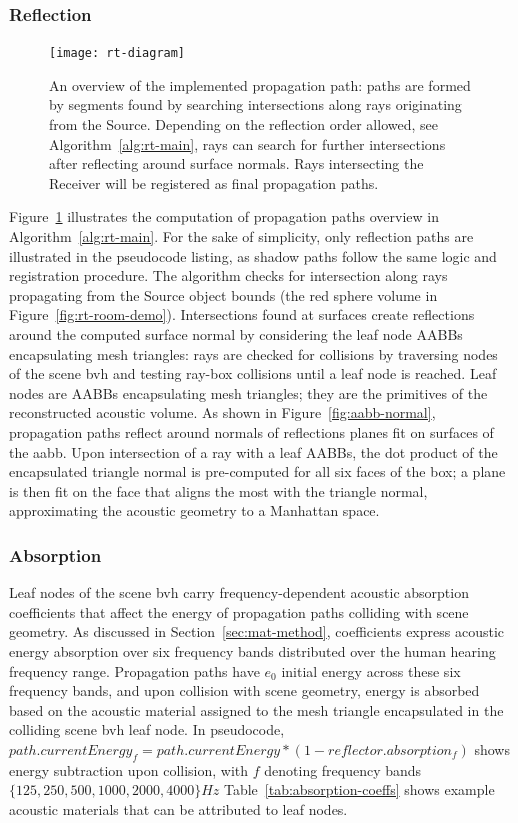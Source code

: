 \subsubsection{Reflection}
\begin{figure}[h]
    \centering
    \texttt{[image: rt-diagram]}
    \caption[Ray Tracing --- propagation diagram]{An overview of the implemented propagation path: paths are formed by segments found by searching intersections along rays originating from the Source. Depending on the reflection order allowed, see Algorithm~\ref{alg:rt-main}, rays can search for further intersections after reflecting around surface normals. Rays intersecting the Receiver will be registered as final propagation paths.}
\label{fig:rt-reflection-diagram}
\end{figure}
Figure~\ref{fig:rt-reflection-diagram} illustrates the computation of propagation paths overview in Algorithm~\ref{alg:rt-main}. For the sake of simplicity, only reflection paths are illustrated in the pseudocode listing, as shadow paths follow the same logic and registration procedure. The algorithm checks for intersection along rays propagating from the Source object bounds (the red sphere volume in Figure~\ref{fig:rt-room-demo}). Intersections found at surfaces create reflections around the computed surface normal by considering the leaf node AABBs encapsulating mesh triangles: rays are checked for collisions by traversing nodes of the scene \acrshort{bvh} and testing ray-box collisions until a leaf node is reached. Leaf nodes are AABBs encapsulating mesh triangles; they are the primitives of the reconstructed acoustic volume. As shown in Figure~\ref{fig:aabb-normal}, propagation paths reflect around normals of reflections planes fit on surfaces of the \acrshort{aabb}. Upon intersection of a ray with a leaf AABBs, the dot product of the encapsulated triangle normal is pre-computed for all six faces of the box; a plane is then fit on the face that aligns the most with the triangle normal, approximating the acoustic geometry to a Manhattan space.\par

\subsubsection{Absorption}
Leaf nodes of the scene \acrshort{bvh} carry frequency-dependent acoustic absorption coefficients that affect the energy of propagation paths colliding with scene geometry. As discussed in Section~\ref{sec:mat-method}, coefficients express acoustic energy absorption over six frequency bands distributed over the human hearing frequency range. Propagation paths have $e_0$ initial energy across these six frequency bands, and upon collision with scene geometry, energy is absorbed based on the acoustic material assigned to the mesh triangle encapsulated in the colliding scene \acrshort{bvh} leaf node. In pseudocode, $path.currentEnergy_f = path.currentEnergy * (1 - reflector.absorption_f)$ shows energy subtraction upon collision, with $f$ denoting frequency bands $\{ 125, 250, 500, 1000, 2000, 4000 \} Hz$ Table~\ref{tab:absorption-coeffs} shows example acoustic materials that can be attributed to leaf nodes. \par

